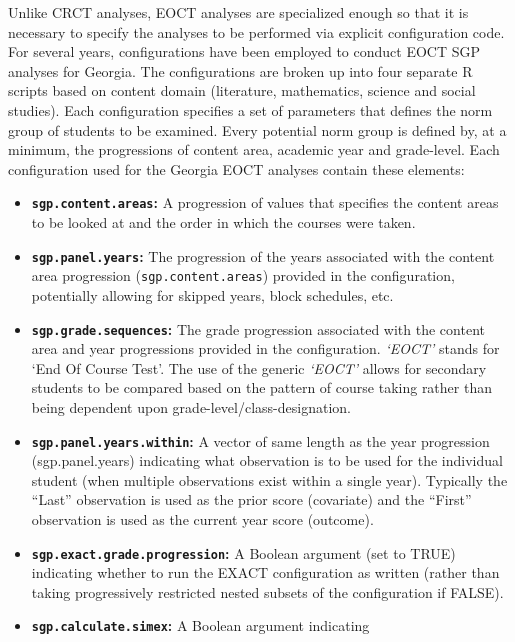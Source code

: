 \documentclass[12pt]{article}
\begin{document}
Unlike CRCT analyses, EOCT analyses are specialized enough so that it is
necessary to specify the analyses to be performed via explicit
configuration code. For several years, configurations have been employed
to conduct EOCT SGP analyses for Georgia. The configurations are broken
up into four separate R scripts based on content domain (literature,
mathematics, science and social studies). Each configuration specifies a
set of parameters that defines the norm group of students to be
examined. Every potential norm group is defined by, at a minimum, the
progressions of content area, academic year and grade-level. Each
configuration used for the Georgia EOCT analyses contain these elements:

\begin{itemize}
\itemsep1pt\parskip0pt
\item
  \textbf{\texttt{sgp.content.areas}:} A progression of values that
  specifies the content areas to be looked at and the order in which the
  courses were taken.
\item
  \textbf{\texttt{sgp.panel.years}:} The progression of the years
  associated with the content area progression
  (\texttt{sgp.content.areas}) provided in the configuration,
  potentially allowing for skipped years, block schedules, etc.
\item
  \textbf{\texttt{sgp.grade.sequences}:} The grade progression
  associated with the content area and year progressions provided in the
  configuration. \emph{`EOCT'} stands for `End Of Course Test'. The use
  of the generic \emph{`EOCT'} allows for secondary students to be
  compared based on the pattern of course taking rather than being
  dependent upon grade-level/class-designation.
\item
  \textbf{\texttt{sgp.panel.years.within}:} A vector of same length as
  the year progression (sgp.panel.years) indicating what observation is
  to be used for the individual student (when multiple observations
  exist within a single year). Typically the ``Last'' observation is
  used as the prior score (covariate) and the ``First'' observation is
  used as the current year score (outcome).
\item
  \textbf{\texttt{sgp.exact.grade.progression}:} A Boolean argument (set
  to TRUE) indicating whether to run the EXACT configuration as written
  (rather than taking progressively restricted nested subsets of the
  configuration if FALSE).
\item
  \textbf{\texttt{sgp.calculate.simex}:} A Boolean argument indicating

\end{itemize}
\end{document}
